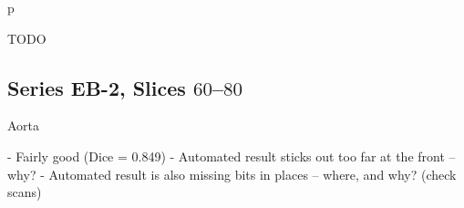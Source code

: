 \begin{stusubfig}{p}
	\hspace{4mm}%
	\hspace{4mm}%
\caption{TODO}
\label{fig:validation-MC-2-110-130}
\end{stusubfig}

\afterpage{\clearpage}
\newpage

\subsection{Series EB-2, Slices $60$--$80$}

\iffalse

Aorta

- Fairly good (Dice = 0.849)
- Automated result sticks out too far at the front -- why?
- Automated result is also missing bits in places -- where, and why? (check scans)

